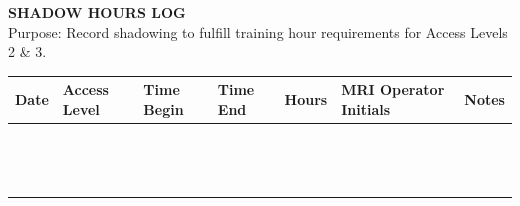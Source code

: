 \documentclass[11pt, letterpaper]{article}
\begin{document}
\begin{center}
    {\Large \textbf{SHADOW HOURS LOG}}\\
    \vspace{5pt}
    Purpose: Record shadowing to fulfill training hour requirements for Access Levels 2 \& 3.
\end{center}

\vspace{15pt}

\noindent
\begin{tabularx}{\textwidth}{
    | >{\centering\arraybackslash}m{2cm} |
    >{\centering\arraybackslash}m{2cm} |
    >{\centering\arraybackslash}m{2cm} |
    >{\centering\arraybackslash}m{2cm} |
    >{\centering\arraybackslash}m{2cm} |
    >{\centering\arraybackslash}m{2cm} |
    >{\centering\arraybackslash}X |}
    \hline
    \rowcolor{lightgray}
    \textbf{Date} & \textbf{Access Level} & \textbf{Time Begin} & \textbf{Time End} & \textbf{Hours} & \textbf{MRI Operator Initials} & \textbf{Notes} \\ \hline
    & & & & & & \\[3.5ex] \hline
    & & & & & & \\[3.5ex] \hline
    & & & & & & \\[3.5ex] \hline
    & & & & & & \\[3.5ex] \hline
    & & & & & & \\[3.5ex] \hline
    & & & & & & \\[3.5ex] \hline
    & & & & & & \\[3.5ex] \hline
    & & & & & & \\[3.5ex] \hline
    & & & & & & \\[3.5ex] \hline
    & & & & & & \\[3.5ex] \hline
    & & & & & & \\[3.5ex] \hline
    & & & & & & \\[3.5ex] \hline
    & & & & & & \\[3.5ex] \hline
    & & & & & & \\[3.5ex] \hline

\end{tabularx}
\end{document}
